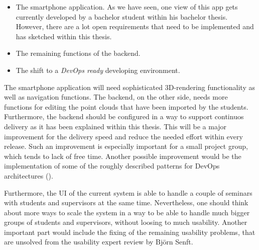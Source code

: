 \begin{itemize}
\item The smartphone application. As we have seen, one view of this app gets currently developed by a bachelor student within his bachelor thesis. However, there are a lot open requirements that need to be implemented and has sketched within this thesis.
\item The remaining functions of the backend.
\item The shift to a \emph{DevOps ready} developing environment. 
\end{itemize}

The smartphone application will need sophisticated 3D-rendering functionality as well as navigation functions. The backend, on the other side, needs more functions for editing the point clouds that have been imported by the students. Furthermore, the backend should be configured in a way to support continuos delivery as it has been explained within this thesis. This will be a major improvement for the delivery speed and reduce the needed effort within every release. Such an improvement is especially important for a small project group, which tends to lack of free time. Another possible improvement would be the implementation of some of the roughly described patterns for DevOps architectures (\cite{cukier2013devops}).

Furthermore, the \ac{UI} of the current system is able to handle a couple of seminars with students and supervisors at the same time. Nevertheless, one should think about more ways to scale the system in a way to be able to handle much bigger groups of students and supervisors, without loosing to much usability. Another important part would include the fixing of the remaining usability problems, that are unsolved from the usability expert review by Bj\"orn Senft. 
